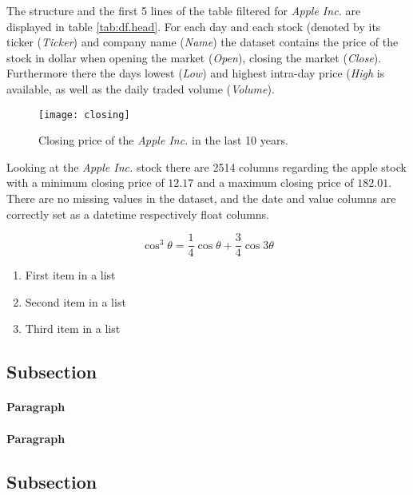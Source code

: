 \documentclass[fleqn,10pt]{SelfArx} %
\begin{document}
The structure and the first 5 lines of the table filtered for \textit{Apple Inc.} are displayed in table \ref{tab:df.head}. For each day and each stock (denoted by its ticker (\textit{Ticker}) and company name (\textit{Name}) the dataset contains the price of the stock in dollar 
when opening the market (\textit{Open}), closing the market (\textit{Close}). Furthermore there the days lowest (\textit{Low}) and highest 
intra-day price (\textit{High} is available, as well as the daily traded volume (\textit{Volume}).

\begin{figure}[ht]\centering
	\texttt{[image: closing]}
	\caption{Closing price of the \textit{Apple Inc.} in the last 10 years.}
	\label{fig:results}
\end{figure}
Looking at the \textit{Apple Inc.} stock there are 2514 columns regarding the apple stock with a minimum closing price of $12.17$ and a maximum closing price of $182.01$. There are no missing values in the dataset, and the date and value columns are correctly set as a datetime respectively float columns.

\begin{equation}
	\cos^3 \theta =\frac{1}{4}\cos\theta+\frac{3}{4}\cos 3\theta
	\label{eq:refname2}
\end{equation}


\begin{enumerate}[noitemsep] %
	\item First item in a list
	\item Second item in a list
	\item Third item in a list
\end{enumerate}

\subsection{Subsection}

\lipsum[6] %

\paragraph{Paragraph} \lipsum[7] %
\paragraph{Paragraph} \lipsum[8] %

\subsection{Subsection}
\end{document}
